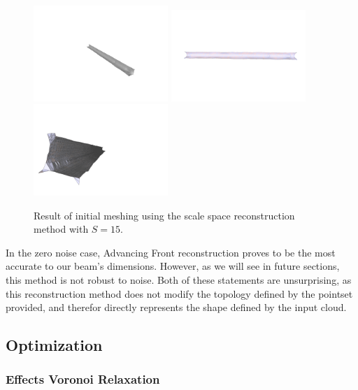 \documentclass[12pt]{drexelthesis}
\let\Oldsubsection\subsection
\renewcommand{\subsection}{\FloatBarrier\Oldsubsection}
\let\Oldsubsubsection\subsubsection
\renewcommand{\subsubsection}{\FloatBarrier\Oldsubsubsection}
\begin{document}
\begin{figure}[!ht]
	\centering
		\includegraphics[trim={5in 2in 3in 3in},clip,width=2in]{simulated-lab-scan/0noise/clean/scalespace1500.png}
		\includegraphics[width=2in]{simulated-lab-scan/0noise/clean/scalespace1501.png}
		\includegraphics[trim={1in 1in 2in 2in}, clip, width=2in]{simulated-lab-scan/0noise/clean/scalespace1502.png}
		\caption[Initial meshing using a scale space reconstruction with $S = 15$]{\centering  Result of initial meshing using the scale space reconstruction method with $S = 15$.}
		\label{zeronoise:scalespace15}
\end{figure}

In the zero noise case, Advancing Front reconstruction proves to be the most accurate to our beam's dimensions. However, as we will see in future sections, this method is not robust to noise. Both of these statements are unsurprising, as this reconstruction method does not modify the topology defined by the pointset provided, and therefor directly represents the shape defined by the input cloud.

\subsection{Optimization}
\subsubsection{Effects Voronoi Relaxation}
\end{document}
